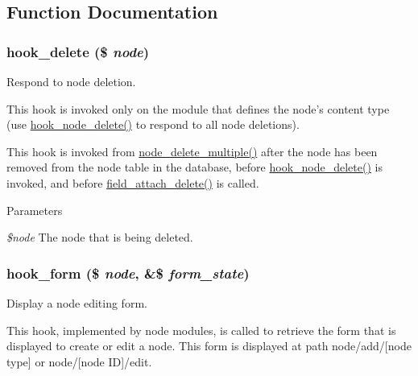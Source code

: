 \subsection{Function Documentation}
\hypertarget{group__node__api__hooks_ga8588d8a814e8aef059d9e0f842904b35}{
\subsubsection[{hook\_\-delete}]{\setlength{\rightskip}{0pt plus 5cm}hook\_\-delete (\$ {\em node})}}
\label{group__node__api__hooks_ga8588d8a814e8aef059d9e0f842904b35}
Respond to node deletion.

This hook is invoked only on the module that defines the node's content type (use \hyperlink{group__node__api__hooks_ga66ea0473a9950dc961802e801e5042e9}{hook\_\-node\_\-delete()} to respond to all node deletions).

This hook is invoked from \hyperlink{node_8module_ab7b4bed8dc18cfa2d8e1839b0429effa}{node\_\-delete\_\-multiple()} after the node has been removed from the node table in the database, before \hyperlink{group__node__api__hooks_ga66ea0473a9950dc961802e801e5042e9}{hook\_\-node\_\-delete()} is invoked, and before \hyperlink{group__field__attach_gac2e3658c9c02d0d0e71359f9ef2f207a}{field\_\-attach\_\-delete()} is called.


\begin{DoxyParams}{Parameters}
\item[{\em \$node}]The node that is being deleted. \end{DoxyParams}
\hypertarget{group__node__api__hooks_ga52618ef4643a60878dd5a76ff9bbff30}{
\subsubsection[{hook\_\-form}]{\setlength{\rightskip}{0pt plus 5cm}hook\_\-form (\$ {\em node}, \/  \&\$ {\em form\_\-state})}}
\label{group__node__api__hooks_ga52618ef4643a60878dd5a76ff9bbff30}
Display a node editing form.

This hook, implemented by node modules, is called to retrieve the form that is displayed to create or edit a node. This form is displayed at path node/add/\mbox{[}node type\mbox{]} or node/\mbox{[}node ID\mbox{]}/edit.

